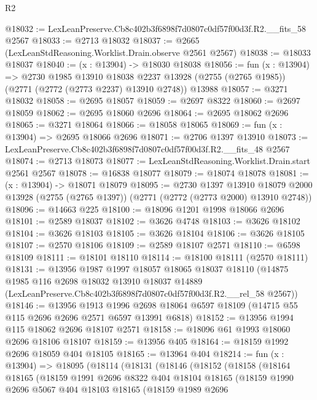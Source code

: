 \begin{lexlean}{R2}
\begin{coremodule}
@18032 := LexLeanPreserve.Cb8c402b3f6898f7d0807c0df57f00d3f.R2.__fits_58 @2567
@18033 := @2713 @18032
@18037 := @2665 (LexLeanStdReasoning.Worklist.Drain.observe @2561 @2567)
@18038 := @18033 @18037
@18040 := (x : @13904) -> @18030 @18038
@18056 := fun (x : @13904) =>
  @2730
    @1985
    @13910
    @18038
    @2237
    @13928
    (@2755 (@2765 @1985))
    (@2771 (@2772 (@2773 @2237) @13910 @2748))
    @13988
@18057 := @3271 @18032
@18058 := @2695 @18057
@18059 := @2697 @8322
@18060 := @2697 @18059
@18062 := @2695 @18060 @2696
@18064 := @2695 @18062 @2696
@18065 := @3271 @18064
@18066 := @18058 @18065
@18069 := fun (x : @13904) => @2695 @18066 @2696
@18071 := @2706 @1397 @13910
@18073 := LexLeanPreserve.Cb8c402b3f6898f7d0807c0df57f00d3f.R2.__fits_48 @2567
@18074 := @2713 @18073
@18077 := LexLeanStdReasoning.Worklist.Drain.start @2561 @2567
@18078 := @16838 @18077
@18079 := @18074 @18078
@18081 := (x : @13904) -> @18071 @18079
@18095 := @2730
    @1397
    @13910
    @18079
    @2000
    @13928
    (@2755 (@2765 @1397))
    (@2771 (@2772 (@2773 @2000) @13910 @2748))
@18096 := @14663 @225
@18100 := @18096 @1201 @1998 @18066 @2696
@18101 := @2589 @18037
@18102 := @3626 @4748
@18103 := @3626 @18102
@18104 := @3626 @18103
@18105 := @3626 @18104
@18106 := @3626 @18105
@18107 := @2570 @18106
@18109 := @2589 @18107 @2571
@18110 := @6598 @18109
@18111 := @18101 @18110
@18114 := @18100 @18111 (@2570 @18111)
@18131 := @13956
    @1987
    @1997
    @18057
    @18065
    @18037
    @18110
    (@14875
      @1985
      @116
      @2698
      @18032
      @13910
      @18037
      @14889
      (LexLeanPreserve.Cb8c402b3f6898f7d0807c0df57f00d3f.R2.__rel_58 @2567))
@18146 := @13956
    @1913
    @1996
    @2698
    @18064
    @6597
    @18109
    (@14715 @55 @115 @2696 @2696 @2571 @6597 @13991 @6818)
@18152 := @13956 @1994 @115 @18062 @2696 @18107 @2571
@18158 := @18096 @61 @1993 @18060 @2696 @18106 @18107
@18159 := @13956 @405
@18164 := @18159 @1992 @2696 @18059 @404 @18105
@18165 := @13964 @404
@18214 := fun (x : @13904) =>
  @18095
    (@18114
      (@18131
        (@18146
          (@18152
            (@18158
              (@18164
                @18165
                (@18159
                  @1991
                  @2696
                  @8322
                  @404
                  @18104
                  @18165
                  (@18159
                    @1990
                    @2696
                    @5067
                    @404
                    @18103
                    @18165
                    (@18159
                      @1989
                      @2696

\end{coremodule}
\end{lexlean}
